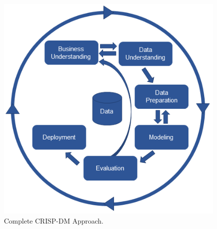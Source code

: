 \begin{figure}[H]
\centering
\includegraphics[width=0.8\linewidth]{Chapters/img/crisp_dm.png}
\caption{Complete CRISP-DM Approach.}
\label{fig:crisp_dm}
\end{figure}

